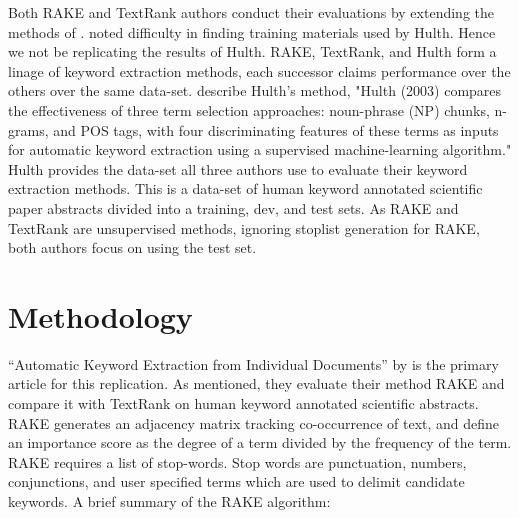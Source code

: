 \documentclass[11pt,a4paper]{article}
\begin{document}
Both RAKE and TextRank authors conduct their evaluations by extending the methods of \citet{hulth-2003-improved}. \citet{1} noted difficulty in finding training materials used by Hulth. Hence we not be replicating the results of Hulth. RAKE, TextRank, and Hulth form a linage of keyword extraction methods, each successor claims performance over the others over the same data-set. \citet{1} describe Hulth's method, "Hulth (2003) compares the effectiveness of three term selection approaches: noun-phrase (NP) chunks, n-grams, and POS tags, with four discriminating features of these terms as inputs for automatic keyword extraction using a supervised machine-learning algorithm." Hulth provides the data-set all three authors use to evaluate their keyword extraction methods. This is a data-set of human keyword annotated scientific paper abstracts divided into a training, dev, and test sets. As RAKE and TextRank are unsupervised methods, ignoring stoplist generation for RAKE, both authors focus on using the test set. 

\section{Methodology}

“Automatic Keyword Extraction from Individual Documents” by \citet{1} is the primary article for this replication. As mentioned, they evaluate their method RAKE and compare it with TextRank on human keyword annotated scientific abstracts. RAKE generates an adjacency matrix tracking co-occurrence of text, and define an importance score as the degree of a term divided by the frequency of the term. RAKE requires a list of stop-words. Stop words are punctuation, numbers, conjunctions, and user specified terms which are used to delimit candidate keywords. A brief summary of the RAKE algorithm:
\end{document}
